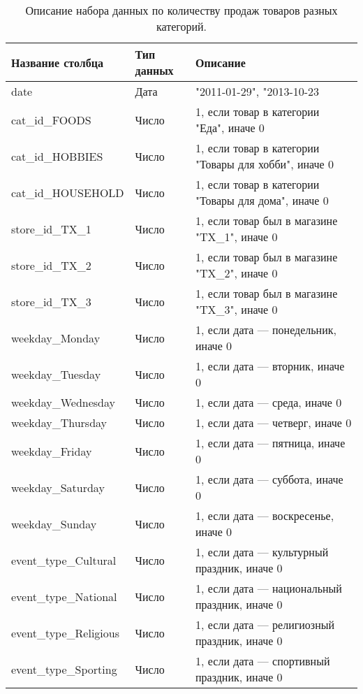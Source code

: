 \begin{table}[h]
    \centering
    \begin{tabular}{|l|l||l|}
		\hline
			Название столбца	& Тип данных				& Описание \\
		\hline
			date				& Дата 			& "2011-01-29", "2013-10-23			\\
			cat\_id\_FOODS		& Число			& 1, если товар в категории "Еда", иначе 0 \\
			cat\_id\_HOBBIES		& Число		& 1, если товар в категории "Товары для хобби", иначе 0 \\
			cat\_id\_HOUSEHOLD	& Число			& 1, если товар в категории "Товары для дома", иначе 0 \\
			store\_id\_TX\_1		& Число		& 1, если товар был в магазине "TX\_1", иначе 0  \\
			store\_id\_TX\_2		& Число		& 1, если товар был в магазине "TX\_2", иначе 0  \\
			store\_id\_TX\_3		& Число		& 1, если товар был в магазине "TX\_3", иначе 0  \\
			weekday\_Monday			& Число  	& 1, если дата --- понедельник, иначе 0		\\
			weekday\_Tuesday		& Число  	& 1, если дата --- вторник, иначе 0		\\
			weekday\_Wednesday		& Число  	& 1, если дата --- среда, иначе 0		\\
			weekday\_Thursday		& Число  	& 1, если дата --- четверг, иначе 0		\\
			weekday\_Friday			& Число  	& 1, если дата --- пятница, иначе 0		\\
			weekday\_Saturday		& Число  	& 1, если дата --- суббота, иначе 0		\\
			weekday\_Sunday			& Число  	& 1, если дата --- воскресенье, иначе 0	\\
			event\_type\_Cultural	& Число 	& 1, если дата --- культурный  праздник, иначе 0 \\
			event\_type\_National	& Число 	& 1, если дата --- национальный  праздник, иначе 0 \\
			event\_type\_Religious	& Число 	& 1, если дата --- религиозный  праздник, иначе 0 \\
			event\_type\_Sporting	& Число 	& 1, если дата --- спортивный праздник, иначе 0 \\
		\hline
	\end{tabular}
	\caption{ Описание набора данных по количеству продаж товаров разных категорий. }
	\label{tbl:sales_dataset_description}
\end{table}

